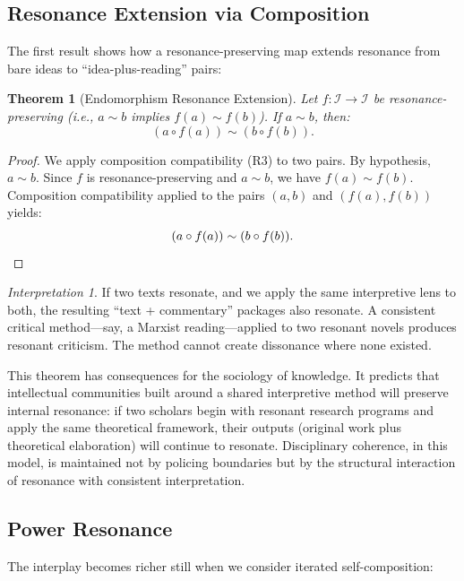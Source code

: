 \documentclass[11pt,openany]{book}
\theoremstyle{definition}
\theoremstyle{plain}
\newtheorem{theorem}[axiom]{Theorem}
\theoremstyle{remark}
\newtheorem{interpretation}[axiom]{Interpretation}
\newcommand{\IS}{\mathcal{I}}               %
\newcommand{\compose}{\circ}                 %
\newcommand{\res}{\sim}                      %
\begin{document}
\subsection{Resonance Extension via Composition}

The first result shows how a resonance-preserving map extends resonance from bare ideas to ``idea-plus-reading'' pairs:

\begin{theorem}[Endomorphism Resonance Extension]
\label{thm:endo-res-ext}
Let $f : \IS \to \IS$ be resonance-preserving (i.e., $a \res b$ implies $f(a) \res f(b)$). If $a \res b$, then:
\[
(a \compose f(a)) \res (b \compose f(b)).
\]
\end{theorem}

\begin{proof}
We apply composition compatibility (R3) to two pairs. By hypothesis, $a \res b$. Since $f$ is resonance-preserving and $a \res b$, we have $f(a) \res f(b)$. Composition compatibility applied to the pairs $(a, b)$ and $(f(a), f(b))$ yields:
\[
(a \compose f(a)) \res (b \compose f(b)). \qedhere
\]
\end{proof}

\begin{interpretation}
If two texts resonate, and we apply the same interpretive lens to both, the resulting ``text + commentary'' packages also resonate. A consistent critical method---say, a Marxist reading---applied to two resonant novels produces resonant criticism. The method cannot create dissonance where none existed.

This theorem has consequences for the sociology of knowledge. It predicts that intellectual communities built around a shared interpretive method will preserve internal resonance: if two scholars begin with resonant research programs and apply the same theoretical framework, their outputs (original work plus theoretical elaboration) will continue to resonate. Disciplinary coherence, in this model, is maintained not by policing boundaries but by the structural interaction of resonance with consistent interpretation.
\end{interpretation}

\subsection{Power Resonance}

The interplay becomes richer still when we consider iterated self-composition:
\end{document}
